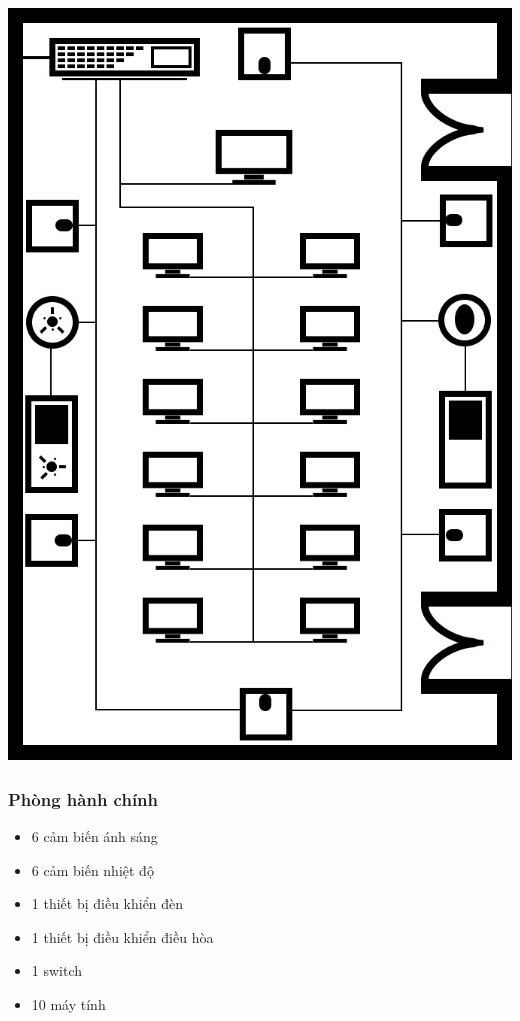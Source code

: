 \documentclass[12pt]{report}
\begin{document}
			\begin{center}
				\includegraphics[scale=0.3]{roomLab.jpg} \\
			\end{center}

		\newpage
		\subsubsection{Phòng hành chính}
		
			\begin{itemize}
				\item 6 cảm biến ánh sáng
				\item 6 cảm biến nhiệt độ
				\item 1 thiết bị điều khiển đèn
				\item 1 thiết bị điều khiển điều hòa
				\item 1 switch
				\item 10 máy tính
			\end{itemize}
		
\end{document}
